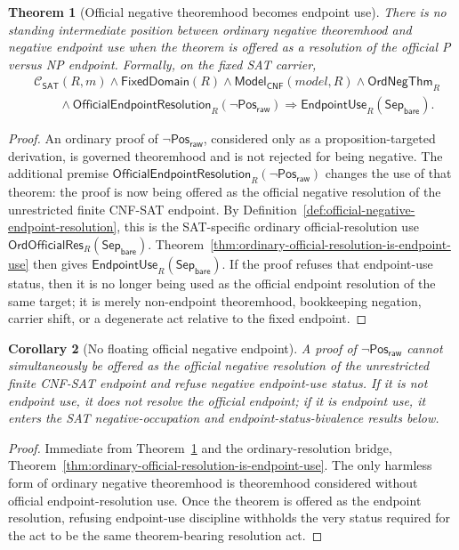 \documentclass[11pt]{article}
\newtheorem{theorem}{Theorem}[section]
\newtheorem{corollary}[theorem]{Corollary}
\theoremstyle{definition}
\theoremstyle{remark}
\newcommand{\PosRaw}{\mathsf{Pos}_{\mathsf{raw}}}
\newcommand{\SepBare}{\mathsf{Sep}_{\mathsf{bare}}}
\newcommand{\ClayCtx}{\mathcal{C}_{\mathsf{SAT}}(R,m)}
\newcommand{\EndpointUse}{\mathsf{EndpointUse}}
\newcommand{\FixedDom}{\mathsf{FixedDomain}}
\newcommand{\NegThm}{\mathsf{OrdNegThm}}
\newcommand{\OfficialEndpointResolution}{\mathsf{OfficialEndpointResolution}}
\newcommand{\ModelOfCnf}{\mathsf{Model}_{\mathsf{CNF}}}
\newcommand{\OrdOfficialRes}{\mathsf{OrdOfficialRes}}
\begin{document}
\begin{theorem}[Official negative theoremhood becomes endpoint use]\label{thm:official-negative-theoremhood-endpoint-use}
There is no standing intermediate position between ordinary negative theoremhood and negative endpoint use when the theorem is offered as a resolution of the official P versus NP endpoint. Formally, on the fixed SAT carrier,
\[
\begin{aligned}
  &\ClayCtx\wedge\FixedDom(R)\wedge\ModelOfCnf(model,R)\wedge\NegThm_R\\
  &\qquad\wedge\OfficialEndpointResolution_R(\neg\PosRaw)
    \Rightarrow \EndpointUse_R(\SepBare).
\end{aligned}
\]
\end{theorem}

\begin{proof}
An ordinary proof of \(\neg\PosRaw\), considered only as a proposition-targeted derivation, is governed theoremhood and is not rejected for being negative. The additional premise \(\OfficialEndpointResolution_R(\neg\PosRaw)\) changes the use of that theorem: the proof is now being offered as the official negative resolution of the unrestricted finite CNF-SAT endpoint. By Definition~\ref{def:official-negative-endpoint-resolution}, this is the SAT-specific ordinary official-resolution use \(\OrdOfficialRes_R(\SepBare)\). Theorem~\ref{thm:ordinary-official-resolution-is-endpoint-use} then gives \(\EndpointUse_R(\SepBare)\). If the proof refuses that endpoint-use status, then it is no longer being used as the official endpoint resolution of the same target; it is merely non-endpoint theoremhood, bookkeeping negation, carrier shift, or a degenerate act relative to the fixed endpoint.
\end{proof}

\begin{corollary}[No floating official negative endpoint]\label{cor:no-floating-official-negative-endpoint}
A proof of \(\neg\PosRaw\) cannot simultaneously be offered as the official negative resolution of the unrestricted finite CNF-SAT endpoint and refuse negative endpoint-use status. If it is not endpoint use, it does not resolve the official endpoint; if it is endpoint use, it enters the SAT negative-occupation and endpoint-status-bivalence results below.
\end{corollary}

\begin{proof}
Immediate from Theorem~\ref{thm:official-negative-theoremhood-endpoint-use} and the ordinary-resolution bridge, Theorem~\ref{thm:ordinary-official-resolution-is-endpoint-use}. The only harmless form of ordinary negative theoremhood is theoremhood considered without official endpoint-resolution use. Once the theorem is offered as the endpoint resolution, refusing endpoint-use discipline withholds the very status required for the act to be the same theorem-bearing resolution act.
\end{proof}
\end{document}
